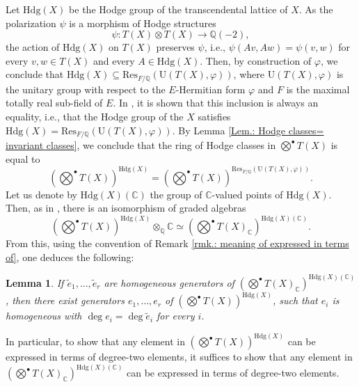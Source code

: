 \documentclass[11pt,twoside,a4paper]{amsart}
\newcommand{\0}{\mathscr{O}}
\newcommand{\Q}{\mathbb{Q}}
\newcommand{\C}{\mathbb{C}}
\theoremstyle{plain}
\newtheorem{lem}[thm]{Lemma}
\theoremstyle{definition}
\theoremstyle{remark}
\begin{document}
Let $\mathrm{Hdg}(X)$ be the Hodge group of the transcendental lattice of $X$. As the polarization $\psi$ is  a morphism of Hodge structures 
\[
\psi\colon T(X)\otimes T(X)\rightarrow \Q(-2),
\]
the action of $\mathrm{Hdg}(X)$ on $T(X)$ preserves $\psi$, i.e., $\psi(Av,Aw)=\psi(v,w)$ for every $v,w\in T(X)$ and every $A\in \mathrm{Hdg}(X)$. Then, by construction of $\varphi$, we conclude that $\mathrm{Hdg}(X)\subseteq \mathrm{Res}_{F/\Q}(\mathrm{U}(T(X),\varphi))$, where $\mathrm{U}(T(X),\varphi)$ is the unitary group with respect to the $E$-Hermitian form $\varphi$ and $F$ is the maximal totally real sub-field of $E$. In \cite[Thm.\ 2.3.1]{zarhin1983hodge}, it is shown that this inclusion is always an equality, i.e., that the Hodge group of the $X$ satisfies
$\mathrm{Hdg}(X)=\mathrm{Res}_{F/\Q}(\mathrm{U}(T(X),\varphi)).$
By Lemma \ref{Lem.: Hodge classes= invariant classes}, we conclude that the ring of Hodge classes in $\bigotimes^{\bullet}T(X)$ is equal to
\begin{equation*}
    \label{eq.: hdg classes in T(X) in the CM case}
\textstyle(\bigotimes^{\bullet}T(X))^{\mathrm{Hdg}(X)}=(\bigotimes^{\bullet}T(X))^{\mathrm{Res}_{F/\Q}(\mathrm{U}(T(X),\varphi))}.
\end{equation*}
Let us denote by $\mathrm{Hdg}(X)(\mathbb{C})$ the group of $\C$-valued points of $\mathrm{Hdg}(X)$. Then, as in \cite[Sec.\ 6.7]{van1994introduction}, there is an isomorphism of graded algebras 
\begin{equation}
\label{eq. invariants and scalar extension}
    \textstyle(\bigotimes^{\bullet} T(X))^{\mathrm{Hdg}(X)}\otimes_{\Q}\C\simeq(\bigotimes^{\bullet}T(X)_\C)^{\mathrm{Hdg}(X)(\mathbb{C})}.
\end{equation}
From this, using the convention of Remark \ref{rmk.: meaning of expressed in terms of}, one deduces the following:
\begin{lem}
\label{Lem: extension of scalars}
If $\widetilde{e}_1,\ldots, \widetilde{e}_r$ are homogeneous generators of $(\bigotimes^{\bullet}T(X)_\C)^{\mathrm{Hdg}(X)(\C)}$, then there exist generators $e_1,\ldots, e_r$ of $(\bigotimes^{\bullet}T(X))^{\mathrm{Hdg}(X)}$, such that $e_i$ is homogeneous with $\deg e_i=\deg \widetilde{e}_i$ for every $i$.
\end{lem}
In particular, to show that any element in $(\bigotimes^{\bullet}T(X))^{\mathrm{Hdg}(X)}$ can be expressed in terms of degree-two elements, it suffices to show that any element in $(\bigotimes^{\bullet}T(X)_\C)^{\mathrm{Hdg}(X)(\C)}$ can be expressed in terms of degree-two elements.
\end{document}
